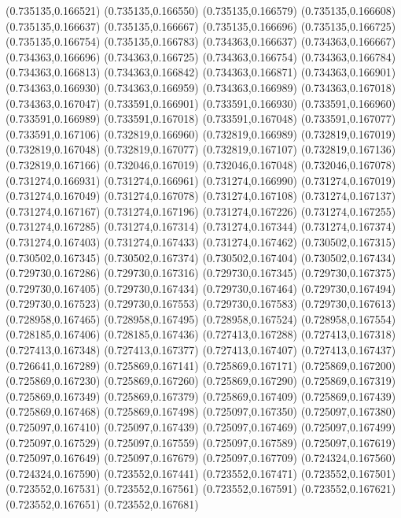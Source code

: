 (0.735135,0.166521)
(0.735135,0.166550)
(0.735135,0.166579)
(0.735135,0.166608)
(0.735135,0.166637)
(0.735135,0.166667)
(0.735135,0.166696)
(0.735135,0.166725)
(0.735135,0.166754)
(0.735135,0.166783)
(0.734363,0.166637)
(0.734363,0.166667)
(0.734363,0.166696)
(0.734363,0.166725)
(0.734363,0.166754)
(0.734363,0.166784)
(0.734363,0.166813)
(0.734363,0.166842)
(0.734363,0.166871)
(0.734363,0.166901)
(0.734363,0.166930)
(0.734363,0.166959)
(0.734363,0.166989)
(0.734363,0.167018)
(0.734363,0.167047)
(0.733591,0.166901)
(0.733591,0.166930)
(0.733591,0.166960)
(0.733591,0.166989)
(0.733591,0.167018)
(0.733591,0.167048)
(0.733591,0.167077)
(0.733591,0.167106)
(0.732819,0.166960)
(0.732819,0.166989)
(0.732819,0.167019)
(0.732819,0.167048)
(0.732819,0.167077)
(0.732819,0.167107)
(0.732819,0.167136)
(0.732819,0.167166)
(0.732046,0.167019)
(0.732046,0.167048)
(0.732046,0.167078)
(0.731274,0.166931)
(0.731274,0.166961)
(0.731274,0.166990)
(0.731274,0.167019)
(0.731274,0.167049)
(0.731274,0.167078)
(0.731274,0.167108)
(0.731274,0.167137)
(0.731274,0.167167)
(0.731274,0.167196)
(0.731274,0.167226)
(0.731274,0.167255)
(0.731274,0.167285)
(0.731274,0.167314)
(0.731274,0.167344)
(0.731274,0.167374)
(0.731274,0.167403)
(0.731274,0.167433)
(0.731274,0.167462)
(0.730502,0.167315)
(0.730502,0.167345)
(0.730502,0.167374)
(0.730502,0.167404)
(0.730502,0.167434)
(0.729730,0.167286)
(0.729730,0.167316)
(0.729730,0.167345)
(0.729730,0.167375)
(0.729730,0.167405)
(0.729730,0.167434)
(0.729730,0.167464)
(0.729730,0.167494)
(0.729730,0.167523)
(0.729730,0.167553)
(0.729730,0.167583)
(0.729730,0.167613)
(0.728958,0.167465)
(0.728958,0.167495)
(0.728958,0.167524)
(0.728958,0.167554)
(0.728185,0.167406)
(0.728185,0.167436)
(0.727413,0.167288)
(0.727413,0.167318)
(0.727413,0.167348)
(0.727413,0.167377)
(0.727413,0.167407)
(0.727413,0.167437)
(0.726641,0.167289)
(0.725869,0.167141)
(0.725869,0.167171)
(0.725869,0.167200)
(0.725869,0.167230)
(0.725869,0.167260)
(0.725869,0.167290)
(0.725869,0.167319)
(0.725869,0.167349)
(0.725869,0.167379)
(0.725869,0.167409)
(0.725869,0.167439)
(0.725869,0.167468)
(0.725869,0.167498)
(0.725097,0.167350)
(0.725097,0.167380)
(0.725097,0.167410)
(0.725097,0.167439)
(0.725097,0.167469)
(0.725097,0.167499)
(0.725097,0.167529)
(0.725097,0.167559)
(0.725097,0.167589)
(0.725097,0.167619)
(0.725097,0.167649)
(0.725097,0.167679)
(0.725097,0.167709)
(0.724324,0.167560)
(0.724324,0.167590)
(0.723552,0.167441)
(0.723552,0.167471)
(0.723552,0.167501)
(0.723552,0.167531)
(0.723552,0.167561)
(0.723552,0.167591)
(0.723552,0.167621)
(0.723552,0.167651)
(0.723552,0.167681)
